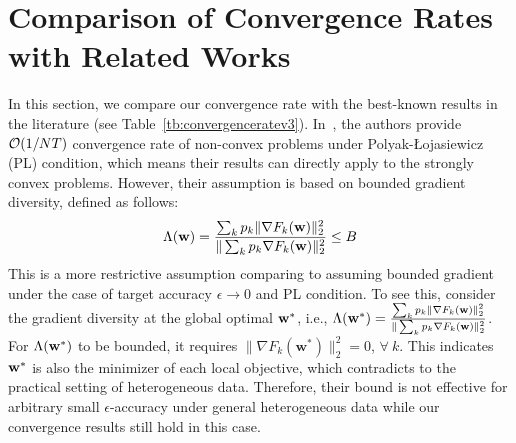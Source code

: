

\section{Comparison of Convergence Rates with Related Works}
\label{sec:app:comparison}
In this section, we compare our convergence rate with the best-known results in the literature (see Table~\ref{tb:convergenceratev3}). 
In~\cite{haddadpour2019convergence}, the authors provide ${\mathcal{O}}(1/NT)$ convergence rate of non-convex problems under Polyak-Łojasiewicz (PL) condition, which
means their results can directly apply to the strongly convex problems. However, their assumption is based on bounded gradient diversity, defined as follows: 
\begin{align*}
	\Lambda({\mathbf{w}}) = \frac{\sum_{k}p_{k}\|\nabla F_{k}(\mathbf{w})\|_{2}^{2}}{\|\sum_{k}p_{k}\nabla F_{k}(\mathbf{w})\|_{2}^{2}} \leq B
\end{align*} 
This is a more restrictive assumption comparing to assuming bounded gradient under the case of target accuracy $\epsilon \rightarrow 0$ and PL condition.
To see this, consider the gradient diversity at the global optimal ${\mathbf{w}}^*$, i.e., $\Lambda({\mathbf{w}}^*) = \frac{\sum_{k}p_{k}\|\nabla F_{k}(\mathbf{w})\|_{2}^{2}}{\|\sum_{k}p_{k}\nabla F_{k}(\mathbf{w})\|_{2}^{2}}$. For $\Lambda({\mathbf{w}}^*)$ to be bounded, it requires $\|\nabla F_{k}(\mathbf{w}^*)\|_{2}^{2} = 0$, $\forall \ k$. This indicates 
${\mathbf{w}}^*$ is also the minimizer of each local objective, which contradicts to the practical setting of heterogeneous data. Therefore, their bound 
is not effective for arbitrary small $\epsilon$-accuracy under general heterogeneous data while our convergence results still hold in this case.

